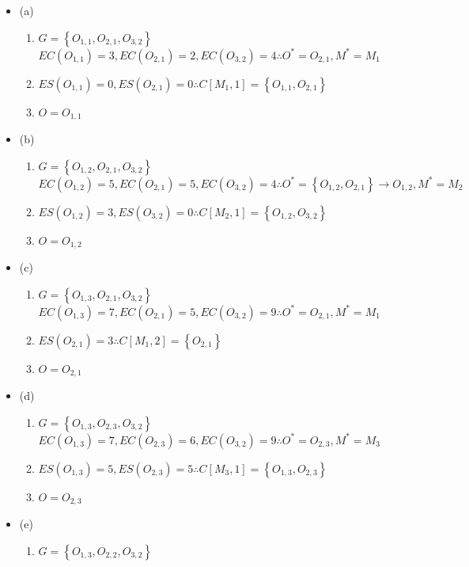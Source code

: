 \documentclass{jsarticle}
\begin{document}
\begin{itemize}
	\item (a)
	\begin{enumerate}
		\item $G=\left\{ O_{1,1},O_{2,1},O_{3,2} \right\}$ \\
			$EC(O_{1,1})=3, EC(O_{2,1})=2, EC(O_{3,2})=4 \therefore O^*=O_{2,1}, M^*=M_1$
		\item $ES(O_{1,1})=0, ES(O_{2,1})=0 \therefore C[M_1,1]=\left\{ O_{1,1}, O_{2,1} \right\}$
		\item $O=O_{1,1}$
	\end{enumerate}
	\item (b)
	\begin{enumerate}
		\item $G=\left\{ O_{1,2},O_{2,1},O_{3,2} \right\}$ \\
			$EC(O_{1,2})=5,EC(O_{2,1})=5,EC(O_{3,2})=4 \therefore
			O^*=\left\{ O_{1,2},O_{2,1} \right\} \rightarrow O_{1,2}, M^*=M_2$
		\item $ES(O_{1,2})=3,ES(O_{3,2})=0 \therefore C[M_2,1]=\left\{ O_{1,2},O_{3,2} \right\}$
		\item $O=O_{1,2}$
	\end{enumerate}
	\item (c)
	\begin{enumerate}
		\item $G=\left\{ O_{1,3},O_{2,1},O_{3,2} \right\}$ \\
			$EC(O_{1,3})=7,EC(O_{2,1})=5,EC(O_{3,2})=9 \therefore
			O^*=O_{2,1}, M^*=M_1$
		\item $ES(O_{2,1})=3 \therefore C[M_1,2]=\left\{ O_{2,1} \right\}$
		\item $O=O_{2,1}$
	\end{enumerate}
	\item (d)
	\begin{enumerate}
		\item $G=\left\{ O_{1,3},O_{2,3},O_{3,2} \right\}$ \\
			$EC(O_{1,3})=7,EC(O_{2,3})=6,EC(O_{3,2})=9 \therefore
			O^*=O_{2,3}, M^*=M_3$
		\item $ES(O_{1,3})=5,ES(O_{2,3})=5 \therefore C[M_3,1]=\left\{ O_{1,3},O_{2,3} \right\}$
		\item $O=O_{2,3}$
	\end{enumerate}
	\item (e)
	\begin{enumerate}
		\item $G=\left\{ O_{1,3},O_{2,2},O_{3,2} \right\}$ \\

\end{enumerate}
\end{itemize}
\end{document}
